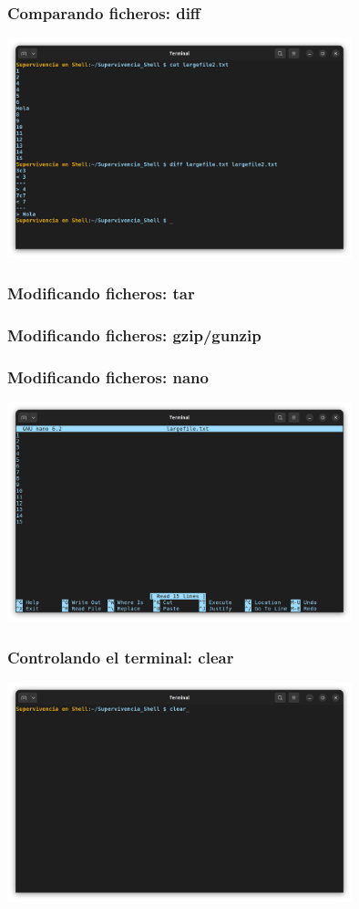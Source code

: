 \documentclass[10pt]{beamer}
\begin{document}
	\begin{frame}
		\frametitle{Comparando ficheros: diff}
		\includegraphics[width=0.75\textwidth]{diff}
	\end{frame}
			
	\begin{frame}
		\frametitle{Modificando ficheros: tar}
	\end{frame}
	
	\begin{frame}
		\frametitle{Modificando ficheros: gzip/gunzip}
	\end{frame}
		
	\begin{frame}
		\frametitle{Modificando ficheros: nano}
		\includegraphics[width=0.75\textwidth]{nano}
	\end{frame}
	
	\begin{frame}
		\frametitle{Controlando el terminal: clear}
		\includegraphics[width=0.75\textwidth]{clear}
	\end{frame}	
	
\end{document}
